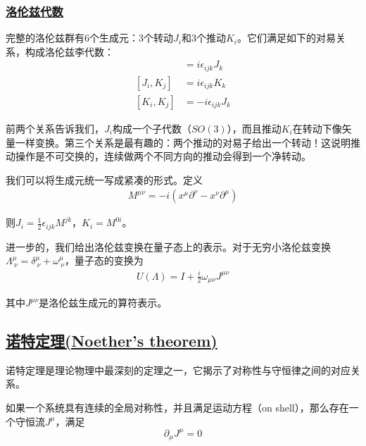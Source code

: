 \subsubsection{\protect\hyperlink{:}{洛伦兹代数}}

完整的洛伦兹群有6个生成元：3个转动$J_i$和3个推动$K_i$。它们满足如下的对易关系，构成洛伦兹李代数：
\begin{align*}
    [J_i, J_j] &= i\epsilon_{ijk}J_k \\
    [J_i, K_j] &= i\epsilon_{ijk}K_k \\
    [K_i, K_j] &= -i\epsilon_{ijk}J_k
\end{align*}

前两个关系告诉我们，$J_i$构成一个子代数（$SO(3)$），而且推动$K_i$在转动下像矢量一样变换。第三个关系是最有趣的：两个推动的对易子给出一个转动！这说明推动操作是不可交换的，连续做两个不同方向的推动会得到一个净转动。

我们可以将生成元统一写成紧凑的形式。定义
\begin{align*}
    M^{\mu\nu} = -i(x^\mu\partial^\nu - x^\nu\partial^\mu)
\end{align*}

则$J_i = \frac{1}{2}\epsilon_{ijk}M^{jk}$，$K_i = M^{0i}$。

进一步的，我们给出洛伦兹变换在量子态上的表示。对于无穷小洛伦兹变换$\varLambda^\mu_{\ \nu} = \delta^\mu_{\ \nu} + \omega^\mu_{\ \nu}$，量子态的变换为
\begin{align*}
    U(\varLambda) = I + \frac{i}{2}\omega_{\mu\nu}J^{\mu\nu}
\end{align*}

其中$J^{\mu\nu}$是洛伦兹生成元的算符表示。

\subsection{\protect\hyperlink{:}{诺特定理(Noether's theorem)}}

诺特定理是理论物理中最深刻的定理之一，它揭示了对称性与守恒律之间的对应关系。

\begin{theorem}[诺特定理]
    如果一个系统具有连续的全局对称性，并且满足运动方程（on shell），那么存在一个守恒流$J^\mu$，满足
    \begin{equation*}
        \partial_\mu J^\mu = 0
    \end{equation*}
\end{theorem}

